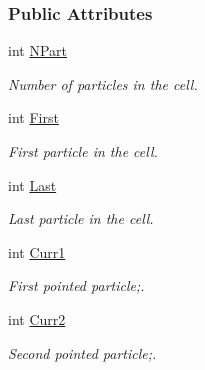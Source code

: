 \subsubsection*{\-Public \-Attributes}
\begin{DoxyCompactItemize}
\item 
\hypertarget{classDomCell_abdcc792391d8c5092471dff191de47f4}{int \hyperlink{classDomCell_abdcc792391d8c5092471dff191de47f4}{\-N\-Part}}\label{classDomCell_abdcc792391d8c5092471dff191de47f4}

\begin{DoxyCompactList}\small\item\em \-Number of particles in the cell. \end{DoxyCompactList}\item 
\hypertarget{classDomCell_a10a3fcd824154f6545a843a16ebf7abb}{int \hyperlink{classDomCell_a10a3fcd824154f6545a843a16ebf7abb}{\-First}}\label{classDomCell_a10a3fcd824154f6545a843a16ebf7abb}

\begin{DoxyCompactList}\small\item\em \-First particle in the cell. \end{DoxyCompactList}\item 
\hypertarget{classDomCell_a341cc2f3f0987c9467af85d3a7fe3754}{int \hyperlink{classDomCell_a341cc2f3f0987c9467af85d3a7fe3754}{\-Last}}\label{classDomCell_a341cc2f3f0987c9467af85d3a7fe3754}

\begin{DoxyCompactList}\small\item\em \-Last particle in the cell. \end{DoxyCompactList}\item 
\hypertarget{classDomCell_a8a6d3113506e7d669ba829887c058f22}{int \hyperlink{classDomCell_a8a6d3113506e7d669ba829887c058f22}{\-Curr1}}\label{classDomCell_a8a6d3113506e7d669ba829887c058f22}

\begin{DoxyCompactList}\small\item\em \-First pointed particle;. \end{DoxyCompactList}\item 
\hypertarget{classDomCell_a46862a195fa643b47b3dddb3dbc05d42}{int \hyperlink{classDomCell_a46862a195fa643b47b3dddb3dbc05d42}{\-Curr2}}\label{classDomCell_a46862a195fa643b47b3dddb3dbc05d42}

\begin{DoxyCompactList}\small\item\em \-Second pointed particle;. \end{DoxyCompactList}\end{DoxyCompactItemize}
